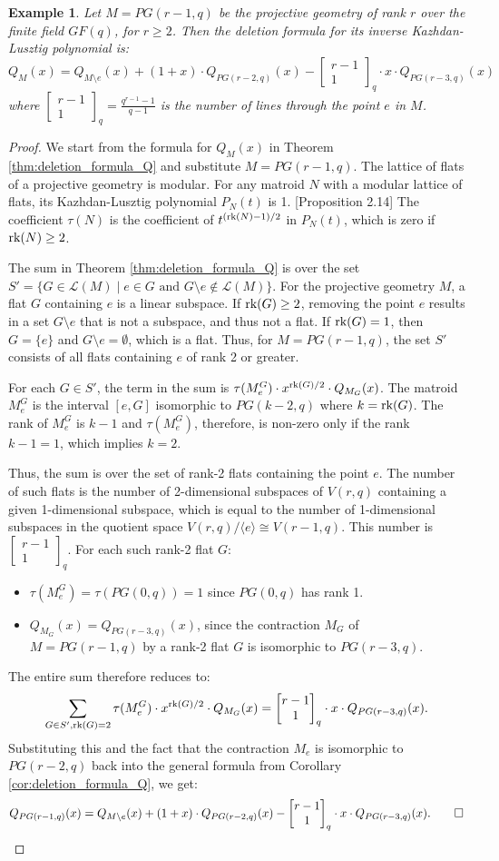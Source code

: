 \documentclass[11pt]{article}
\newcommand{\rank}{\normalfont\text{rk}}
\newcommand{\qbinom}[2]{\begin{bmatrix} #1 \\ #2 \end{bmatrix}_q}
\newtheorem{example}[theorem]{Example}
\theoremstyle{remark}
\begin{document}
\begin{example}
    Let $M = PG(r-1, q)$ be the projective geometry of rank $r$ over the finite field $GF(q)$, for $r \geq 2$. Then the deletion formula for its inverse Kazhdan-Lusztig polynomial is:
    \[
        Q_M(x) = Q_{M\setminus e}(x) + (1 + x)\cdot Q_{PG(r-2,q)}(x) - \qbinom{r-1}{1} \cdot x \cdot Q_{PG(r-3,q)}(x)
    \]
    where $\qbinom{r-1}{1} = \frac{q^{r-1}-1}{q-1}$ is the number of lines through the point $e$ in $M$.
\end{example}
\begin{proof}
    We start from the formula for $Q_M(x)$ in Theorem \ref{thm:deletion_formula_Q} and substitute $M = PG(r-1, q)$.
    The lattice of flats of a projective geometry is modular. For any matroid $N$ with a modular lattice of flats,
    its Kazhdan-Lusztig polynomial $P_N(t)$ is 1. \cite{elias-proudfoot-wakefield}[Proposition 2.14]
    The coefficient $\tau(N)$ is the coefficient of $t^{(\rank(N)-1)/2}$ in $P_N(t)$, which is zero if $\rank(N) \geq 2$.

    The sum in Theorem \ref{thm:deletion_formula_Q} is over the set
    $S' = \{G \in \mathcal{L}(M) \mid e \in G \text{ and } G\setminus e \notin \mathcal{L}(M)\}$.
    For the projective geometry $M$, a flat $G$ containing $e$ is a linear subspace. If $\rank(G) \geq 2$, removing the point $e$ results in a set $G\setminus e$ that is not a subspace, and thus not a flat. If $\rank(G)=1$, then $G=\{e\}$ and $G\setminus e = \emptyset$, which is a flat. Thus, for $M=PG(r-1,q)$, the set $S'$ consists of all flats containing $e$ of rank 2 or greater.

    For each $G \in S'$, the term in the sum is $\tau(M^G_e)\cdot x^{\rank(G)/2} \cdot Q_{M_G}(x)$.
    The matroid $M^G_e$ is the interval $[e, G]$ isomorphic to $PG(k-2,q)$ where $k=\rank(G)$.
    The rank of $M^G_e$ is $k-1$ and $\tau(M^G_e)$, therefore, is non-zero only if the rank $k-1=1$, which implies $k=2$.

    Thus, the sum is over the set of rank-2 flats containing the point $e$.
    The number of such flats is the number of 2-dimensional subspaces of $V(r,q)$ containing a given 1-dimensional subspace, which is equal to the number of 1-dimensional subspaces in the quotient space $V(r,q)/\langle e \rangle \cong V(r-1,q)$. This number is $\qbinom{r-1}{1}$. For each such rank-2 flat $G$:
    \begin{itemize}
        \item $\tau(M^G_e) = \tau(PG(0,q)) = 1$ since $PG(0,q)$ has rank 1.
        \item $Q_{M_G}(x) = Q_{PG(r-3,q)}(x)$, since the contraction $M_G$ of $M=PG(r-1,q)$ by a rank-2 flat $G$ is isomorphic to $PG(r-3,q)$.
    \end{itemize}
    The entire sum therefore reduces to:
    \[
        \sum_{G \in S', \rank(G)=2} \tau(M^G_e)\cdot x^{\rank(G)/2} \cdot Q_{M_G}(x) = \qbinom{r-1}{1} \cdot x \cdot Q_{PG(r-3,q)}(x).
    \]
    Substituting this and the fact that the contraction $M_e$ is isomorphic to $PG(r-2,q)$ back into the general formula from Corollary \ref{cor:deletion_formula_Q}, we get:
    \[
        Q_{PG(r-1,q)}(x) = Q_{M\setminus e}(x) + (1 + x)\cdot Q_{PG(r-2,q)}(x) - \qbinom{r-1}{1} \cdot x \cdot Q_{PG(r-3,q)}(x). \qed
    \]
\end{proof}
\end{document}
